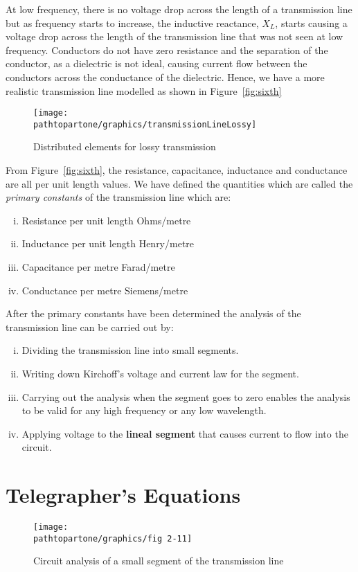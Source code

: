 At low frequency, there is no voltage drop across the length of a transmission line but as frequency starts to increase, the inductive reactance, $X_{L}$, starts causing a voltage drop across the length of the transmission line that was not seen at low frequency. Conductors do not have zero resistance and the separation of the conductor, as a dielectric is not ideal, causing current flow between the conductors across the conductance of the dielectric. Hence, we have a more realistic transmission line modelled as shown in Figure~\ref{fig:sixth}
\begin{figure}[h]
\centering
\texttt{[image: \\pathtopartone/graphics/transmissionLineLossy]}
\caption{Distributed elements for lossy transmission}
\label{fig:transmissionLineLossy}
\end{figure}


From Figure~\ref{fig:sixth}, the resistance, capacitance, inductance and conductance are all per unit length values. We have defined the quantities which are called the \textit{primary constants} of the transmission line which are:
\begin{enumerate}[(i)]
\item Resistance per unit length \textemdash\; Ohms/metre
\item Inductance per unit length \textemdash\; Henry/metre
\item Capacitance per metre \textemdash\; Farad/metre
\item Conductance per metre \textemdash\; Siemens/metre
\end{enumerate}
After the primary constants have been determined the analysis of the transmission line can be carried out by:

\begin{enumerate}[(i)]
\item Dividing the transmission line into small segments.
\item Writing down Kirchoff's voltage and current law for the segment.
\item Carrying out the analysis when the segment goes to zero enables the analysis to be valid for any high frequency or any low wavelength. 
\item Applying voltage to the \textbf{lineal segment} that causes current to flow into the circuit.
\end{enumerate}

\section{Telegrapher's Equations}
\begin{figure}[h]
\centering
\texttt{[image: \\pathtopartone/graphics/fig 2-11]}
\caption{Circuit analysis of a small segment of the transmission line}
\label{fig:seventh}
\end{figure}


